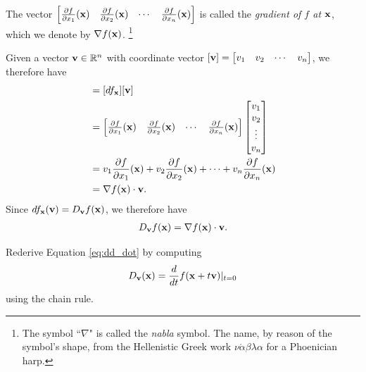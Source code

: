 \documentclass[12pt,letterpaper,reqno]{article}
\numberwithin{equation}{section}
\newcommand{\R}{\ensuremath{\mathbb R}}
\newcommand{\bv}{{\bf v}}
\newcommand{\bx}{{\bf x}}
\begin{document}
{\begin{defn}[Gradient]
	The vector $\begin{bmatrix}
		\frac{\partial f}{\partial x_1}(\bx) & \frac{\partial f}{\partial x_2}(\bx) & \cdots & \frac{\partial f}{\partial x_n}(\bx)
	\end{bmatrix}$ is called the \emph{gradient of $f$ at $\bx$}, which we denote by $\nabla f(\bx)$. \footnote{The symbol ``$\nabla$" is called the \emph{nabla} symbol. The name, by reason of the symbol's shape, from the Hellenistic Greek work $\nu \acute{\alpha} \beta \lambda \alpha$ for a Phoenician harp.}
\end{defn}
Given a vector $\bv \in \R^n$ with coordinate vector $[\bv]=\begin{bmatrix}
	v_1 & v_2 & \cdots & v_n
\end{bmatrix}$, we therefore have
\begin{align*}
	[df_\bx(\bv)]&=[df_\bx][\bv] \\
	&=\begin{bmatrix}
		\frac{\partial f}{\partial x_1}(\bx) & \frac{\partial f}{\partial x_2}(\bx) & \cdots & \frac{\partial f}{\partial x_n}(\bx)
	\end{bmatrix} \begin{bmatrix}
	v_1 \\ v_2 \\ \vdots \\ v_n
\end{bmatrix} \\
&=v_1\frac{\partial f}{\partial x_1}(\bx)+v_2\frac{\partial f}{\partial x_2}(\bx)+\cdots+v_n\frac{\partial f}{\partial x_n}(\bx) \\
&=\nabla f(\bx) \cdot \bv.
\end{align*}
Since $df_\bx(\bv)=D_\bv f(\bx)$, we therefore have
\begin{align}\label{eq:dd_dot}
	D_\bv f(\bx)=\nabla f(\bx) \cdot \bv.
\end{align}

\begin{exercise}
Rederive Equation \eqref{eq:dd_dot} by computing
\begin{align*}
	D_\bv(\bx)=\frac{d}{dt}f(\bx+t\bv)|_{t=0}
\end{align*}	
using the chain rule.
\end{exercise}

}
\end{document}
